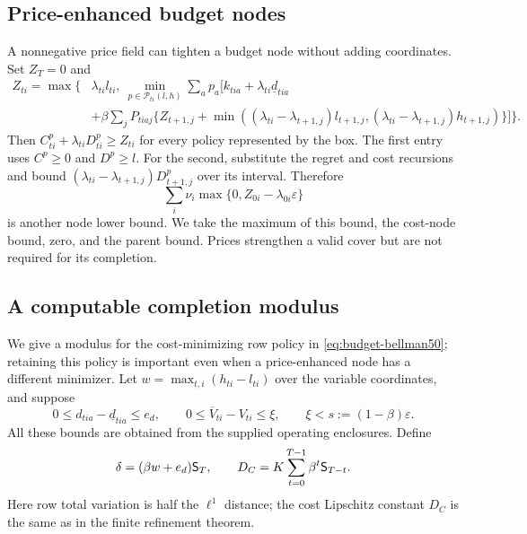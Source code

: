 \subsection{Price-enhanced budget nodes}
A nonnegative price field can tighten a budget node without adding coordinates. Set $Z_T=0$ and
\begin{align}
 Z_{ti}=\max\bigg\{&\lambda_{ti}l_{ti},\ 
 \min_{p\in\mathcal P_{ti}(l,h)}\sum_a p_a\bigg[k_{tia}+\lambda_{ti}\underline d_{tia}\nonumber\\[-2pt]
 &+\beta\sum_jP_{tiaj}\{Z_{t+1,j}
 +\min((\lambda_{ti}-\lambda_{t+1,j})l_{t+1,j},
       (\lambda_{ti}-\lambda_{t+1,j})h_{t+1,j})\}\bigg]\bigg\}.
 \label{eq:budget-price50}
\end{align}
Then $C^p_{ti}+\lambda_{ti}D^p_{ti}\ge Z_{ti}$ for every policy represented by the box. The first entry uses $C^p\ge0$ and $D^p\ge l$. For the second, substitute the regret and cost recursions and bound $(\lambda_{ti}-\lambda_{t+1,j})D^p_{t+1,j}$ over its interval. Therefore
\[
 \sum_i\nu_i\max\{0,Z_{0i}-\lambda_{0i}\varepsilon\}
\]
is another node lower bound. We take the maximum of this bound, the cost-node bound, zero, and the parent bound. Prices strengthen a valid cover but are not required for its completion.

\subsection{A computable completion modulus}
We give a modulus for the cost-minimizing row policy in \eqref{eq:budget-bellman50}; retaining this policy is important even when a price-enhanced node has a different minimizer. Let $w=\max_{t,i}(h_{ti}-l_{ti})$ over the variable coordinates, and suppose
\[
 0\le d_{tia}-\underline d_{tia}\le e_d,
 \qquad 0\le\overline V_{ti}-V_{ti}\le\xi,
 \qquad \xi<s:=(1-\beta)\varepsilon.
\]
All these bounds are obtained from the supplied operating enclosures. Define
\[
 \delta=(\beta w+e_d)\mathsf S_{T},
 \qquad D_C=K\sum_{t=0}^{T-1}\beta^t\mathsf S_{T-t}.
\]
Here row total variation is half the $\ell^1$ distance; the cost Lipschitz constant $D_C$ is the same as in the finite refinement theorem.

